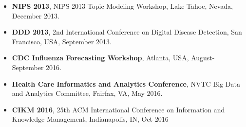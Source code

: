 \begin{itemize}
  \item {\bf NIPS 2013}, NIPS 2013 Topic Modeling Workshop, Lake Tahoe, Nevada, December 2013.
  \item {\bf DDD 2013}, 2nd International Conference on Digital Disease
    Detection, San Francisco, USA, September 2013.
  \item {\bf CDC Influenza Forecasting Workshop}, Atlanta, USA, August-September 2016.
  \item {\bf Health Care Informatics and Analytics Conference}, NVTC Big Data and Analytics Committee, Fairfax, VA, May 2016.
  \item {\bf CIKM 2016}, 25th ACM International Conference on Information and Knowledge Management, Indianapolis, IN, Oct 2016
\end{itemize}


